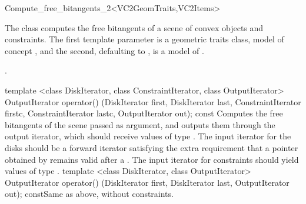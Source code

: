 
\ccRefPageBegin

\begin{ccRefFunctionObjectClass}{Compute_free_bitangents_2<VC2GeomTraits,VC2Items>}

\ccDefinition
  
The class \ccRefName{} computes the free bitangents of a scene of convex
objects and constraints. The first template parameter is a geometric traits
class, model of concept , and the second, defaulting to
, is a model of .


\ccTypes
{}

\ccGlue
{}
\ccGlue
{}.

\ccOperations
\ccMethod
{template <class DiskIterator, class ConstraintIterator, class OutputIterator>
  OutputIterator operator()
    (DiskIterator first, DiskIterator last,
     ConstraintIterator firstc, ConstraintIterator lastc,
     OutputIterator out); const}
{Computes the free bitangents of the scene passed as argument, and outputs
them through the output iterator, which should receive values of type
. The input iterator for the disks should be a forward
iterator satisfying the extra requirement that a pointer obtained by
 remains valid after a \ccc{++}. The input iterator for
constraints should yield values of type .}
\ccGlue
\ccMethod
{template <class DiskIterator, class OutputIterator>
  OutputIterator operator()
    (DiskIterator first, DiskIterator last,
     OutputIterator out); const}{Same as above, without constraints.}
\ccTagDefaults



\end{ccRefFunctionObjectClass}
